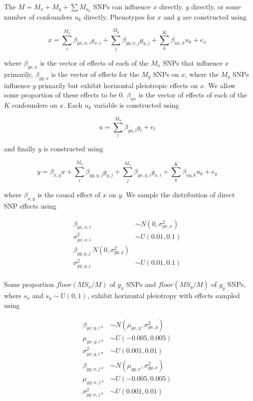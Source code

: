 \documentclass[]{article}
\begin{document}
The \(M = M_x + M_y + \sum{M_{u_k}}\) SNPs can influence \(x\) directly,
\(y\) directly, or some number of confounders \(u_{k}\) directly.
Phenotypes for \(x\) and \(y\) are constructed using

\[
x = \sum^{M_x}_{i}{\beta_{gx,x,i}g_{x,i}} + \sum^{M_y}_{j}{\beta_{gy,x,j}g_{y,j}} + \sum^{K}_{k}{\beta_{ux,k} u_{k}} + e_{x}
\]

where \(\beta_{gx,x}\) is the vector of effects of each of the \(M_x\)
SNPs that influence \(x\) primarily, \(\beta_{gy,x}\) is the vector of
effects for the \(M_y\) SNPs on \(x\), where the \(M_y\) SNPs influence
\(y\) primarily but exhibit horizontal pleiotropic effects on \(x\). We
allow some proportion of these effects to be 0. \(\beta_{ux}\) is the
vector of effects of each of the \(K\) confounders on \(x\). Each
\(u_{k}\) variable is constructed using

\[
u = \sum^{M_u}_{l}{\beta_{gu,l}g_{l}} + e_{l}
\]

and finally \(y\) is constructed using

\[
y = \beta_{x,y}x + \sum^{M_y}_{i}{\beta_{gy,y,j}g_{y,j}} + \sum^{M_x}_{j}{\beta_{gx,y,i}g_{x,i}} + \sum^{K}_{k}{\beta_{uy,k} u_{k}} + e_{y}
\]

where \(\beta_{x,y}\) is the causal effect of \(x\) on \(y\). We sample
the distribution of direct SNP effects using

\[
\begin{aligned}
\beta_{gx,x,i} & \sim N(0, \sigma^2_{gx,x}) \\
\sigma^2_{gx,x,i} & \sim U(0.01, 0.1) \\
\beta_{gy,y,j} ~ N(0, \sigma^2_{gy,y}) \\
\sigma^2_{gy,y,j} & \sim U(0.01, 0.1) \\
\end{aligned}
\]

Some proportion \(floor(MS_{x}/M)\) of \(g_x\) SNPs and
\(floor(MS_{y}/M)\) of \(g_y\) SNPs, where \(s_x\) and
\(s_y \sim U(0,1)\), exhibit horizontal pleiotropy with effects sampled
using

\[
\begin{aligned}
\beta_{gx,y,i*} & \sim N(\mu_{gx,y}, \sigma^2_{gx,y})  \\
\mu_{gx,y,i*} & \sim U(-0.005, 0.005) \\
\sigma^2_{gx,y,i*} & \sim U(0.001, 0.01) \\
\beta_{gy,x,j*} & \sim N(\mu_{gy,x}, \sigma^2_{gy,x}) \\
\mu_{gy,x,j*} & \sim U(-0.005, 0.005) \\
\sigma^2_{gy,x,j*} & \sim U(0.001, 0.01) \\
\end{aligned}
\]
\end{document}
